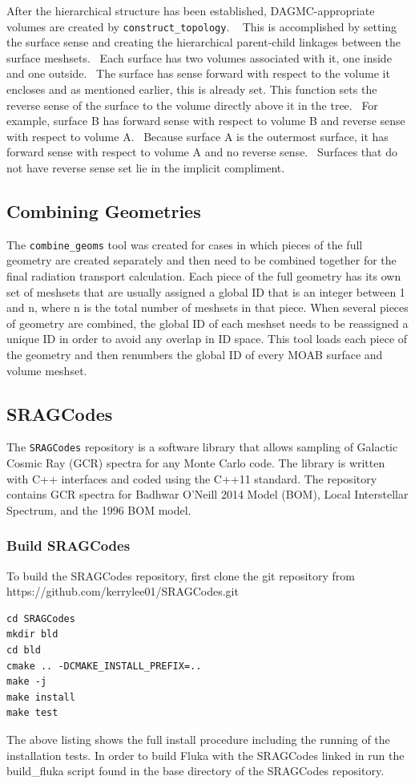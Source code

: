 After the hierarchical structure has been established, DAGMC-appropriate volumes are created by \texttt{construct\_topology}.  
This is accomplished by setting the surface sense and creating the hierarchical parent-child linkages between the 
surface meshsets.  Each surface has two volumes associated with it, one inside and one outside.  The surface has 
sense forward with respect to the volume it encloses and as mentioned earlier, this is already set. This function sets 
the reverse sense of the surface to the volume directly above it in the tree.  For example, surface B has forward 
sense with respect to volume B and reverse sense with respect to volume A.  Because surface A is the outermost surface, 
it has forward sense with respect to volume A and no reverse sense.  Surfaces that do not have reverse sense set lie in the 
implicit compliment.

\subsection{Combining Geometries}
The \texttt{combine\_geoms} tool \cite{combine} was created for cases in which pieces of the full geometry are created
separately and then need to be combined together for the final radiation transport
calculation.  Each piece of the full geometry has its own set of meshsets that are usually assigned a global ID
that is an integer between 1 and n, where n is the total number of 
meshsets in that piece.  When several pieces of geometry are combined, the global ID of each
meshset needs to be reassigned a unique ID in order to avoid any overlap in ID space.  This tool loads each piece of
the geometry and then renumbers the global ID of every MOAB surface and volume meshset.


\subsection{SRAGCodes}
The \texttt{SRAGCodes} repository is a software library that allows sampling of Galactic Cosmic Ray (GCR)
spectra for any Monte Carlo code. The library is written with C++ interfaces and coded using the C++11 
standard. The repository contains GCR spectra for Badhwar O'Neill 2014 Model (BOM), Local Interstellar Spectrum, and
the 1996 BOM model.

\subsubsection*{Build SRAGCodes}
To build the SRAGCodes repository, first clone the git repository from https://github.com/kerrylee01/SRAGCodes.git
\lstset{language=bash} 
\begin{lstlisting}
cd SRAGCodes
mkdir bld
cd bld
cmake .. -DCMAKE_INSTALL_PREFIX=..
make -j
make install
make test
\end{lstlisting}
The above listing shows the full install procedure including the running of the installation tests. In order to build
Fluka with the SRAGCodes linked in run the build\_fluka script found in the base directory of the SRAGCodes repository.
